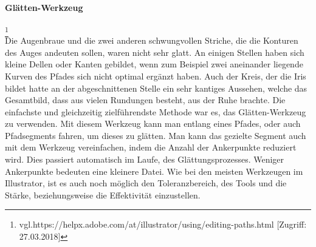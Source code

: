 \paragraph{Glätten-Werkzeug}
\footnote{\label{} vgl.https://helpx.adobe.com/at/illustrator/using/editing-paths.html  [Zugriff: 27.03.2018]}
\leavevmode \\
Die Augenbraue und die zwei anderen schwungvollen Striche, die die Konturen des Auges andeuten sollen, waren nicht sehr glatt. An einigen Stellen haben sich kleine Dellen oder Kanten gebildet, wenn zum Beispiel zwei aneinander liegende Kurven des Pfades sich nicht optimal ergänzt haben. Auch der Kreis, der die Iris bildet hatte an der abgeschnittenen Stelle ein sehr kantiges Aussehen, welche das Gesamtbild, dass aus vielen Rundungen besteht, aus der Ruhe brachte. Die einfachste und gleichzeitig zielführendste Methode war es, das Glätten-Werkzeug zu verwenden. Mit diesem Werkzeug kann man entlang eines Pfades, oder auch Pfadsegments fahren, um dieses zu glätten. Man kann das gezielte Segment auch mit dem Werkzeug vereinfachen, indem die Anzahl der Ankerpunkte reduziert wird. Dies passiert automatisch im Laufe, des Glättungsprozesses. Weniger Ankerpunkte bedeuten eine kleinere Datei. Wie bei den meisten Werkzeugen im Illustrator, ist es auch noch möglich den Toleranzbereich, des Tools und die Stärke, beziehungsweise die Effektivität einzustellen.

